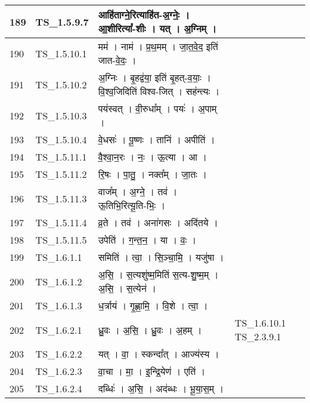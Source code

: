 \documentclass[17pt]{extarticle}
\begin{document}
\begin{longtable}{||p{0.4in}||p{0.9in}||p{4.0in}||p{0.9in}||}
            189 & TS\_1.5.9.7 & आहि॑ताग्ने॒रित्याहि॑त{-}अ॒ग्नेः॒   ।   आ॒शीरित्या᳚{-}शीः   ।   यत्   ।   अ॒ग्निम्   ।    &      \\
        \hline
            190 & TS\_1.5.10.1 & मम॑   ।   नाम॑   ।   प्र॒थ॒मम्   ।   जा॒त॒वे॒द॒ इति॑ जात{-}वे॒दः॒   ।    &      \\
        \hline
            191 & TS\_1.5.10.2 & अ॒ग्निः   ।   बृ॒हद्व॑या॒ इति॑ बृ॒हत्{-}व॒याः॒   ।   वि॒श्व॒जिदिति॑ विश्व{-}जित्   ।   सह॑न्त्यः   ।    &      \\
        \hline
            192 & TS\_1.5.10.3 & पय॑स्वत्   ।   वी॒रुधा᳚म्   ।   पयः॑   ।   अ॒पाम्   ।    &      \\
        \hline
            193 & TS\_1.5.10.4 & वे॒धसः॑   ।   पू॒ष्णः   ।   तानि॑   ।   अपीति॑   ।    &      \\
        \hline
            194 & TS\_1.5.11.1 & वै॒श्वा॒न॒रः   ।   नः॒   ।   ऊ॒त्या   ।   आ   ।    &      \\
        \hline
            195 & TS\_1.5.11.2 & रि॒षः   ।   पा॒तु॒   ।   नक्त᳚म्   ।   जा॒तः   ।    &      \\
        \hline
            196 & TS\_1.5.11.3 & वाज᳚म्   ।   अ॒ग्ने॒   ।   तव॑   ।   ऊ॒तिभि॒रित्यू॒ति{-}भिः॒   ।    &      \\
        \hline
            197 & TS\_1.5.11.4 & व्र॒ते   ।   तव॑   ।   अना॑गसः   ।   अदि॑तये   ।    &      \\
        \hline
            198 & TS\_1.5.11.5 & उपेति॑   ।   ग॒न्त॒न॒   ।   या   ।   वः॒   ।    &      \\
        \hline
            199 & TS\_1.6.1.1 & समिति॑   ।   त्वा॒   ।   सि॒ञ्चा॒मि॒   ।   यजु॑षा   ।    &      \\
        \hline
            200 & TS\_1.6.1.2 & अ॒सि॒   ।   स॒त्यशु॑ष्म॒मिति॑ स॒त्य{-}शु॒ष्म॒म्   ।   अ॒सि॒   ।   स॒त्येन॑   ।    &      \\
        \hline
            201 & TS\_1.6.1.3 & ध॒र्त्राय॑   ।   गृ॒ह्णा॒मि॒   ।   वि॒शे   ।   त्वा॒   ।    &      \\
        \hline
            202 & TS\_1.6.2.1 & ध्रु॒वः   ।   अ॒सि॒   ।   ध्रु॒वः   ।   अ॒हम्   ।    &  TS\_1.6.10.1 TS\_2.3.9.1       \\
        \hline
            203 & TS\_1.6.2.2 & यत्   ।   वा॒   ।   स्कन्दा᳚त्   ।   आज्य॑स्य   ।    &      \\
        \hline
            204 & TS\_1.6.2.3 & वा॒चा   ।   मा॒   ।   इ॒न्द्रि॒येण॑   ।   एति॑   ।    &      \\
        \hline
            205 & TS\_1.6.2.4 & दब्धिः॑   ।   अ॒सि॒   ।   अद॑ब्धः   ।   भू॒या॒स॒म्   ।    &      \\

\end{longtable}
\end{document}
